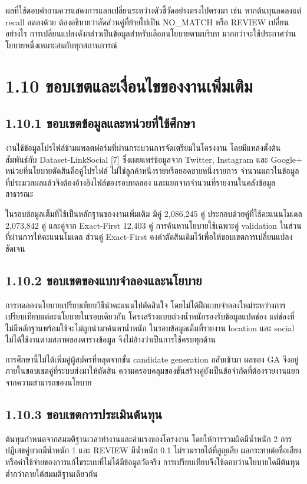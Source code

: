\documentclass[12pt,a4paper]{report}
\begin{document}
ผลที่ใช้ตอบคำถามควรแสดงการแลกเปลี่ยนระหว่างตัวชี้วัดอย่างตรงไปตรงมา เช่น หากต้นทุนลดลงแต่ recall ลดลงด้วย ต้องอธิบายว่าสัดส่วนคู่ที่ย้ายไปเป็น NO\_MATCH หรือ REVIEW เปลี่ยนอย่างไร การเปลี่ยนแปลงดังกล่าวเป็นข้อมูลสำหรับเลือกนโยบายตามบริบท มากกว่าจะใช้ประกาศว่านโยบายหนึ่งเหมาะสมกับทุกสถานการณ์

\section*{1.10 ขอบเขตและเงื่อนไขของงานเพิ่มเติม}
\subsection*{1.10.1 ขอบเขตข้อมูลและหน่วยที่ใช้ศึกษา}
งานใช้ข้อมูลโปรไฟล์ข้ามแพลตฟอร์มที่ผ่านกระบวนการจัดเตรียมในโครงงาน โดยมีแหล่งตั้งต้นสัมพันธ์กับ Dataset-LinkSocial [7] ซึ่งเผยแพร่ข้อมูลจาก Twitter, Instagram และ Google+ หน่วยที่นโยบายตัดสินคือคู่โปรไฟล์ ไม่ใช่ลูกค้าหนึ่งรายหรือยอดขายหนึ่งรายการ จำนวนแถวในข้อมูลที่ประมวลผลแล้วจึงต้องอ้างอิงไฟล์ของรอบทดลอง และแยกจากจำนวนที่รายงานในคลังข้อมูลสาธารณะ

ในรอบข้อมูลเต็มที่ใช้เป็นหลักฐานของงานเพิ่มเติม มีคู่ 2,086,245 คู่ ประกอบด้วยคู่ที่ใช้คะแนนโมเดล 2,073,842 คู่ และคู่จาก Exact-First 12,403 คู่ การค้นหานโยบายใช้เฉพาะคู่ validation ในส่วนที่ผ่านการให้คะแนนโมเดล ส่วนคู่ Exact-First คงคำตัดสินเดิมไว้เพื่อให้ขอบเขตการเปลี่ยนแปลงชัดเจน

\subsection*{1.10.2 ขอบเขตของแบบจำลองและนโยบาย}
การทดลองนโยบายเปรียบเทียบวิธีนำคะแนนไปตัดสินใจ โดยไม่ได้ฝึกแบบจำลองใหม่ระหว่างการเปรียบเทียบแต่ละนโยบายในรอบเดียวกัน โครงสร้างแบบถ่วงน้ำหนักรองรับข้อมูลแปดช่อง แต่ช่องที่ไม่มีหลักฐานพร้อมใช้จะไม่ถูกนำมาค้นหาน้ำหนัก ในรอบข้อมูลเต็มที่รายงาน location และ social ไม่ได้ใช้งานตามสภาพของตารางข้อมูล จึงไม่อ้างว่าเป็นการใช้ครบทุกด้าน

การศึกษานี้ไม่ได้เพิ่มคู่ผู้สมัครที่หลุดจากขั้น candidate generation กลับเข้ามา ผลของ GA จึงอยู่ภายในขอบเขตคู่ที่ระบบส่งมาให้ตัดสิน ความครอบคลุมของขั้นสร้างคู่ยังเป็นข้อจำกัดที่ต้องรายงานแยกจากความสามารถของนโยบาย

\subsection*{1.10.3 ขอบเขตการประเมินต้นทุน}
ต้นทุนกำหนดจากสมมติฐานเวลาทำงานและค่าแรงของโครงงาน โดยให้การรวมผิดมีน้ำหนัก 2 การปฏิเสธคู่บวกมีน้ำหนัก 1 และ REVIEW มีน้ำหนัก 0.1 ไม่รวมรายได้ที่สูญเสีย ผลกระทบต่อชื่อเสียง หรือค่าใช้จ่ายของการแก้ไขระบบที่ไม่ได้มีข้อมูลวัดจริง การเปรียบเทียบจึงใช้ตอบว่านโยบายใดมีต้นทุนต่ำกว่าภายใต้สมมติฐานเดียวกัน
\end{document}
